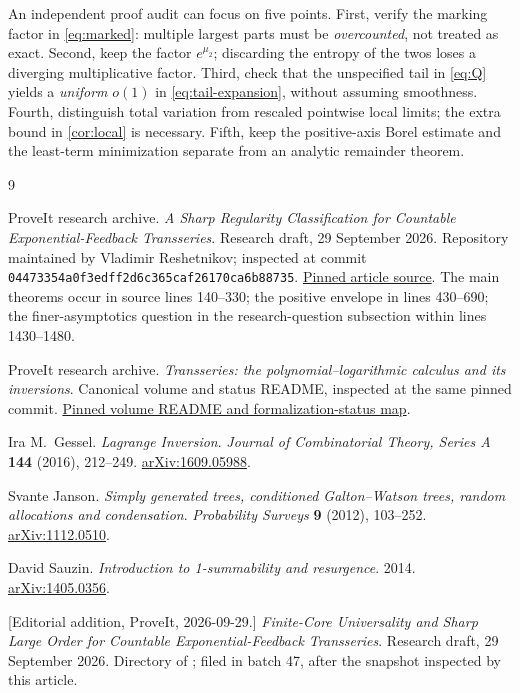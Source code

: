\documentclass[11pt,a4paper]{article}
\theoremstyle{definition}
\numberwithin{equation}{section}
\begin{document}
An independent proof audit can focus on five points. First, verify the
marking factor in \eqref{eq:marked}: multiple largest parts must be
\emph{overcounted}, not treated as exact. Second, keep the factor
\(e^{\mu_2}\); discarding the entropy of the twos loses a diverging
multiplicative factor. Third, check that the unspecified tail in
\eqref{eq:Q} yields a \emph{uniform} \(o(1)\) in
\eqref{eq:tail-expansion}, without assuming smoothness. Fourth, distinguish
total variation from rescaled pointwise local limits; the extra bound in
\cref{cor:local} is necessary. Fifth, keep the positive-axis Borel estimate
and the least-term minimization separate from an analytic remainder theorem.

\begin{thebibliography}{9}
\raggedright

ProveIt research archive.
\emph{A Sharp Regularity Classification for Countable Exponential-Feedback
Transseries}. Research draft, 29 September 2026.
Repository maintained by Vladimir Reshetnikov; inspected at commit
\texttt{04473354a0f3edff2d6c365caf26170ca6b88735}.
\href{https://github.com/VladimirReshetnikov/ProveIt/blob/04473354a0f3edff2d6c365caf26170ca6b88735/Analysis/Transseries/docs/series-and-transseries/Exponential_Feedback_Regularity_Classification/article.tex}{Pinned article source}.
The main theorems occur in source lines 140--330; the positive envelope in
lines 430--690; the finer-asymptotics question in the research-question
subsection within lines 1430--1480.

ProveIt research archive.
\emph{Transseries: the polynomial--logarithmic calculus and its inversions}.
Canonical volume and status README, inspected at the same pinned commit.
\href{https://github.com/VladimirReshetnikov/ProveIt/blob/04473354a0f3edff2d6c365caf26170ca6b88735/Analysis/Transseries/docs/series-and-transseries/Transseries_And_Inversion/README.md}{Pinned volume README and formalization-status map}.

Ira M.~Gessel.
\emph{Lagrange Inversion}.
\emph{Journal of Combinatorial Theory, Series A} \textbf{144} (2016), 212--249.
\href{https://arxiv.org/abs/1609.05988}{arXiv:1609.05988}.

Svante Janson.
\emph{Simply generated trees, conditioned Galton--Watson trees, random
allocations and condensation}.
\emph{Probability Surveys} \textbf{9} (2012), 103--252.
\href{https://arxiv.org/abs/1112.0510}{arXiv:1112.0510}.

David Sauzin.
\emph{Introduction to 1-summability and resurgence}. 2014.
\href{https://arxiv.org/abs/1405.0356}{arXiv:1405.0356}.

[Editorial addition, ProveIt, 2026-09-29.]
\emph{Finite-Core Universality and Sharp Large Order for Countable
Exponential-Feedback Transseries}. Research draft, 29 September 2026.
Directory  of
; filed in batch 47,
after the snapshot inspected by this article.
\end{thebibliography}
\end{document}
